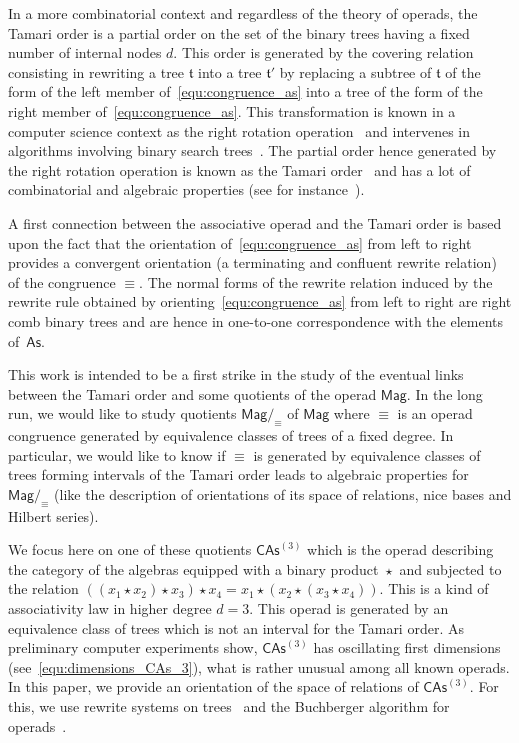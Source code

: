 \documentclass[10pt,reqno]{amsart}
\numberwithin{equation}{subsection}
\newcommand{\Tfr}{\mathfrak{t}}
\newcommand{\Mag}{\mathsf{Mag}}
\newcommand{\As}{\mathsf{As}}
\newcommand{\CAs}[1]{\mathsf{CAs}^{(#1)}}
\DeclareMathOperator{\Product}{\star}
\DeclareMathOperator{\Congr}{\equiv}
\begin{document}
In a more combinatorial context and regardless of the theory of operads,
the Tamari order is a partial order on the set of the binary trees
having a fixed number of internal nodes $d$. This order is generated by
the covering relation consisting in rewriting a tree $\Tfr$ into a tree
$\Tfr'$ by replacing a subtree of $\Tfr$ of the form of the left member
of~\eqref{equ:congruence_as} into a tree of the form of the right member
of~\eqref{equ:congruence_as}. This transformation is known in a computer
science context as the right rotation operation~\cite{Knu98} and
intervenes in algorithms involving binary search trees~\cite{AVL62}. The
partial order hence generated by the right rotation operation is known
as the Tamari order~\cite{Tam62} and has a lot of combinatorial and
algebraic properties (see for instance~\cite{HT72,Cha06}).

A first connection between the associative operad and the Tamari order
is based upon the fact that the orientation of~\eqref{equ:congruence_as}
from left to right provides a convergent orientation (a terminating and 
confluent rewrite relation) of the congruence $\Congr$. The normal 
forms of the rewrite relation induced by the rewrite rule obtained by 
orienting~\eqref{equ:congruence_as} from left to right are right comb 
binary trees and are hence in one-to-one correspondence with the 
elements of~$\As$.

This work is intended to be a first strike in the study of the eventual
links between the Tamari order and some quotients of the operad $\Mag$.
In the long run, we would like to study quotients $\Mag/_{\Congr}$ of
$\Mag$ where $\Congr$ is an operad congruence generated by equivalence
classes of trees of a fixed degree. In particular, we would like to know
if $\Congr$ is generated by equivalence classes of trees forming
intervals of the Tamari order leads to algebraic properties for
$\Mag/_{\Congr}$ (like the description of orientations of its space of
relations, nice bases and Hilbert series).

We focus here on one of these quotients $\CAs{3}$ which is the operad
describing the category of the algebras equipped with a binary product
$\Product$ and subjected to the relation
\begin{math}
    ((x_1 \Product x_2) \Product x_3) \Product x_4
    =
    x_1 \Product (x_2 \Product (x_3 \Product x_4))
\end{math}.
This is a kind of associativity law in higher degree $d = 3$. This
operad is generated by an equivalence class of trees which is not an
interval for the Tamari order. As preliminary computer experiments show,
$\CAs{3}$ has oscillating first dimensions
(see~\eqref{equ:dimensions_CAs_3}), what is rather unusual among all
known operads. In this paper, we provide an orientation of the space of
relations of $\CAs{3}$. For this, we use rewrite systems on
trees~\cite{BN98} and the Buchberger algorithm for operads~\cite{DK10}.
\end{document}

